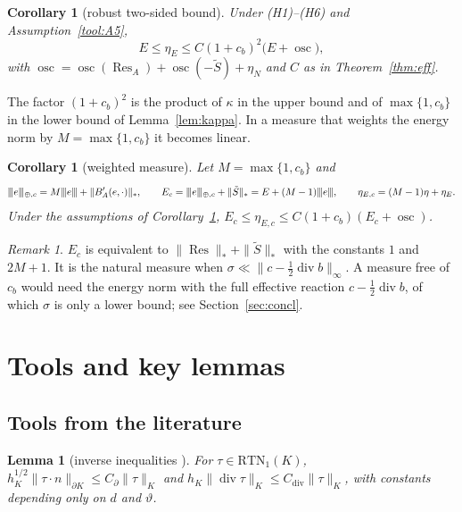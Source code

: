 \documentclass[11pt]{article}
\newcommand{\tnorm}[1]{\lvert\kern-0.25ex\lvert\kern-0.25ex\lvert #1\rvert\kern-0.25ex\rvert\kern-0.25ex\rvert}
\newcommand{\Res}{\operatorname{Res}}
\newcommand{\osc}{\operatorname{osc}}
\newcommand{\Stil}{\tilde S}
\newcommand{\RTN}{\mathrm{RTN}_1}
\newcommand{\dv}{\operatorname{div}}
\theoremstyle{plain}
\newtheorem{lemma}[theorem]{Lemma}
\newtheorem{corollary}[theorem]{Corollary}
\theoremstyle{remark}
\newtheorem{remark}[theorem]{Remark}
\numberwithin{equation}{section}
\begin{document}
\begin{corollary}[robust two-sided bound]\label{cor:two}
Under (H1)--(H6) and Assumption~\ref{tool:A5},
\[
  E\le\eta_E\le C(1+c_b)^2\bigl(E+\osc\bigr),
\]
with $\osc=\osc(\Res_A)+\osc(-\Stil)+\eta_N$ and $C$ as in Theorem~\ref{thm:eff}.
\end{corollary}

The factor $(1+c_b)^2$ is the product of $\kappa$ in the upper bound and of $\max\{1,c_b\}$ in the
lower bound of Lemma~\ref{lem:kappa}. In a measure that weights the energy norm by
$M=\max\{1,c_b\}$ it becomes linear.

\begin{corollary}[weighted measure]\label{cor:twoc}
Let $M=\max\{1,c_b\}$ and
\[
  \tnorm{e}_{\oplus,c}=M\tnorm{e}+\|B_A'(e,\cdot)\|_*,\qquad
  E_c=\tnorm{e}_{\oplus,c}+\|\Stil\|_*=E+(M-1)\tnorm{e},\qquad
  \eta_{E,c}=(M-1)\eta+\eta_E.
\]
Under the assumptions of Corollary~\ref{cor:two},
$E_c\le\eta_{E,c}\le C(1+c_b)(E_c+\osc)$.
\end{corollary}

\begin{remark}
$E_c$ is equivalent to $\|\Res\|_*+\|\Stil\|_*$ with the constants $1$ and $2M+1$. It is the
natural measure when $\sigma\ll\|c-\frac12\dv b\|_\infty$. A measure free of $c_b$ would need the
energy norm with the full effective reaction $c-\frac12\dv b$, of which $\sigma$ is only a lower
bound; see Section~\ref{sec:concl}.
\end{remark}

\section{Tools and key lemmas}\label{sec:lemmas}

\subsection{Tools from the literature}

\begin{lemma}[inverse inequalities {\cite[Lemma~2.2]{SV20}}]\label{tool:A1}
For $\tau\in\RTN(K)$,
$h_K^{1/2}\|\tau\cdot n\|_{\partial K}\le C_\partial\|\tau\|_K$ and
$h_K\|\dv\tau\|_K\le C_{\dv}\|\tau\|_K$, with constants depending only on $d$ and $\vartheta$.
\end{lemma}
\end{document}
